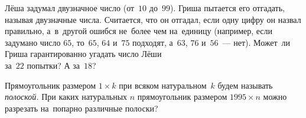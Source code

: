 \begin{problems}
\item
Лёша задумал двузначное число (от~$10$ до~$99$).
Гриша пытается его отгадать, называя двузначные числа.
Считается, что он отгадал, если одну цифру он назвал правильно, а~в~другой
ошибся не~более чем на~единицу (например, если задумано число $65$, то~$65$,
$64$ и~$75$ подходят, а~$63$, $76$ и~$56$~--- нет).
Может~ли Гриша гарантированно угадать число Лёши
\\
\subproblem за~$22$ попытки?
\qquad
\subproblem А за~$18$?

\item
Прямоугольник размером $1 \times k$ при всяком натуральном~$k$ будем называть
\emph{полоской.}
При каких натуральных $n$ прямоугольник размером $1995 \times n$ можно
разрезать на~попарно различные полоски?

\end{problems}

